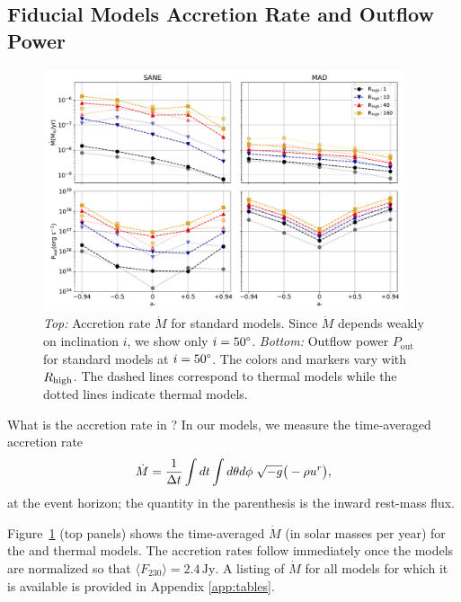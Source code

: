 \subsection{Fiducial Models Accretion Rate and Outflow Power}
\label{sec:accrate_outflowpower}

\begin{figure}
  \centering
  \includegraphics[width=0.95\textwidth]{figures/bhac_kharma_average_mdot_pout.pdf}
  \caption{{\it Top:} Accretion rate $\dot{M}$ for standard models.
    Since $\dot{M}$ depends weakly on inclination $i$, we show only $i=50\degree$.
    {\it Bottom:} Outflow power $P_\mathrm{out}$ for standard models at $i = 50\degree$.
    The colors and markers vary with $R_\mathrm{high}$.
    The dashed lines correspond to \kharma thermal models while the dotted lines indicate \bhac thermal models.}
  \label{fig:accretion_outflow_power_illinois_thermal}
\end{figure}

What is the accretion rate in \sgra?  In our models, we measure the time-averaged accretion rate
\begin{equation}
  \dot{M} = \frac{1}{\Delta t}\int dt\int d\theta d\phi\hspace{0.1cm}\sqrt{-g}\big(-\rho u^{r}\big),
\end{equation}
at the event horizon; the quantity in the parenthesis is the inward rest-mass flux.

Figure~\ref{fig:accretion_outflow_power_illinois_thermal} (top panels) shows the time-averaged $\dot{M}$ (in solar masses per year) for the \kharma and \bhac thermal models.
The accretion rates follow immediately once the models are normalized so that $\langle F_{230}\rangle = 2.4\,\mathrm{Jy}$.
A listing of $\dot{M}$ for all models for which it is available is provided in Appendix \ref{app:tables}.

